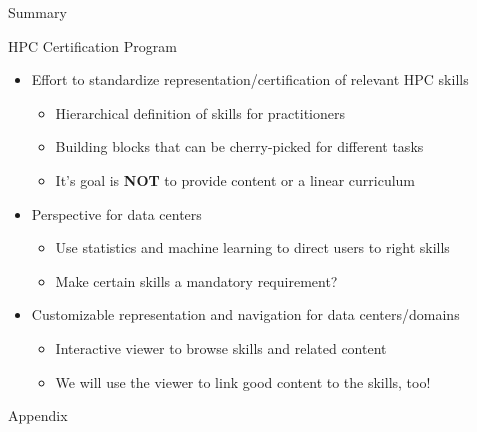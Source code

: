 \documentclass[compress,aspectratio=169]{beamer}
\begin{document}
\begin{frame}{Summary}

	\begin{block}{HPC Certification Program}
		\begin{itemize}
			\item Effort to standardize representation/certification of relevant HPC skills
      \begin{itemize}
        \item Hierarchical definition of skills for practitioners
        \item Building blocks that can be cherry-picked for different tasks
				\item It's goal is \textbf{NOT} to provide content or a linear curriculum
      \end{itemize}
			\item Perspective for data centers
				\begin{itemize}
					\item Use statistics and machine learning to direct users to right skills
					\item Make certain skills a mandatory requirement?
				\end{itemize}
			\item Customizable representation and navigation for data centers/domains
      \begin{itemize}
        \item Interactive viewer to browse skills and related content
				\item We will use the viewer to link good content to the skills, too!
      \end{itemize}
		\end{itemize}
	\end{block}
  \label{pg:lastpage}
\end{frame}

\appendix 

\begin{frame}{Appendix}
\end{frame}
\end{document}
